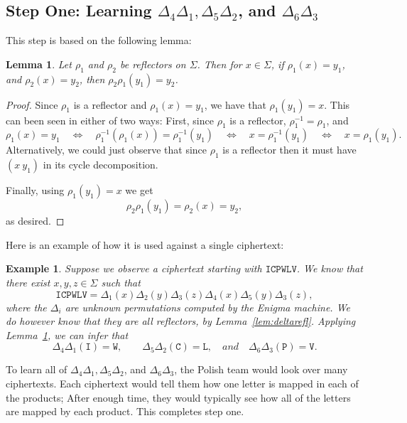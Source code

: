 \documentclass[11pt]{article}
\newtheorem{lemma}{Lemma}
\newtheorem{example}{Example}
\begin{document}
\subsection{Step One: Learning $\Delta_4\Delta_1,\Delta_5\Delta_2$,
        and $\Delta_6\Delta_3$}

This step is based on the following lemma:
\begin{lemma}\label{lem:repeats}
    Let $\rho_1$ and $\rho_2$ be reflectors on $\Sigma$.
    Then for $x\in\Sigma$, if $\rho_1(x)=y_1$, and $\rho_2(x)=y_2$, then
    $\rho_2\rho_1(y_1)=y_2$.
\end{lemma}
\begin{proof}
    Since $\rho_1$ is a reflector and $\rho_1(x)=y_1$, we have that
    $\rho_1(y_1)=x$. This can been seen in either of two
    ways: First, since $\rho_1$ is a reflector, $\rho_1^{-1}=\rho_1$,
    and
    \[
        \rho_1(x)=y_1 \quad \iff \quad 
        \rho_1^{-1}(\rho_1(x))=\rho_1^{-1}(y_1) \quad \iff \quad 
        x=\rho_1^{-1}(y_1) \quad \iff \quad 
        x=\rho_1(y_1). 
    \]
    Alternatively, we could just observe that since $\rho_1$ is a reflector
    then it must have $(x\ y_1)$ in its cycle decomposition.

    Finally, using $\rho_1(y_1)=x$ we get
    \[
        \rho_2\rho_1(y_1) = 
        \rho_2(x) = y_2,
    \]
    as desired.
\end{proof}

Here is an example of how it is used against a single ciphertext:
\begin{example}
Suppose we observe a ciphertext starting with $\mathtt{ICPWLV}$. We know
that there exist $x,y,z\in\Sigma$ such that
\[
\mathtt{ICPWLV} = \Delta_1(x)\Delta_2(y)\Delta_3(z)
    \Delta_4(x)\Delta_5(y)\Delta_3(z),
\]
where the $\Delta_i$ are unknown permutations computed by the Enigma machine.
We do however know that they are all reflectors, by
Lemma~\ref{lem:deltarefl}.  Applying Lemma~\ref{lem:repeats}, we can infer
that
\[
    \Delta_4\Delta_1(\mathtt{I})=\mathtt{W},
    \quad \quad
    \Delta_5\Delta_2(\mathtt{C})=\mathtt{L},
    \quad and \quad
    \Delta_6\Delta_3(\mathtt{P})=\mathtt{V}.
\]
\end{example}

To learn all of $\Delta_4\Delta_1,\Delta_5\Delta_2$, and $\Delta_6\Delta_3$,
the Polish team would look over many ciphertexts. Each ciphertext would
tell them how one letter is mapped in each of the products; After enough time,
they would typically see how all of the letters are mapped by each product.
This completes step one.
\end{document}

